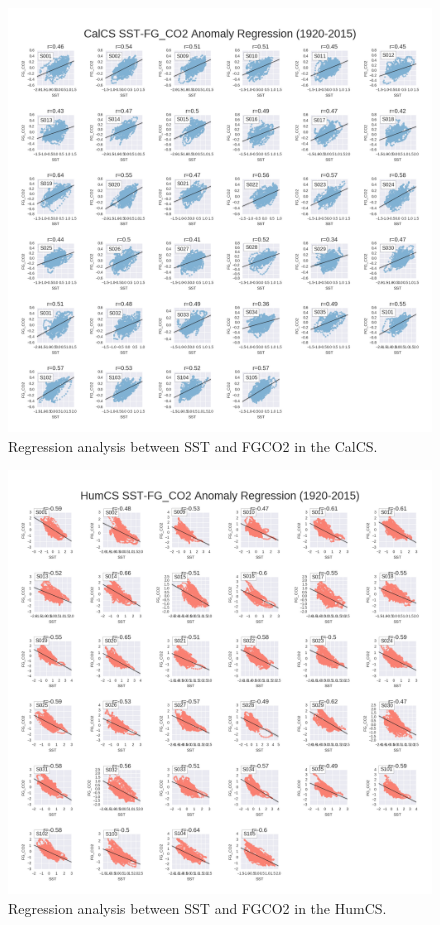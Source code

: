 \documentclass[12pt]{article}
\begin{document}
\clearpage
\begin{figure}[!h]
	\centering
	\includegraphics[width=\linewidth]{../../figs/calcs/regression_plots/smoothed_FGCO2_vs_smoothed_SSTregression_subplots.png}
	\caption{Regression analysis between SST and FGCO2 in the CalCS.}
	\label{fig:CalCS-SST-regressions}
\end{figure}

\clearpage
\begin{figure}[!h]
	\centering
	\includegraphics[width=\linewidth]{../../figs/humcs/regression_plots/smoothed_FGCO2_vs_smoothed_SSTregression_subplots.png}
	\caption{Regression analysis between SST and FGCO2 in the HumCS.}
	\label{fig:HumCS-SST-regressions}
\end{figure}
\end{document}
